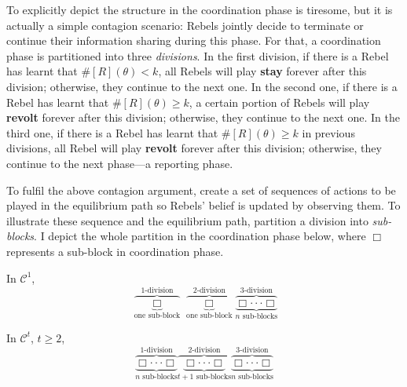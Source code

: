 \documentclass[12pt,letter]{article}
\newcommand{\Kappa}{\mathcal{C}}
\theoremstyle{definition}
\theoremstyle{remark}
\theoremstyle{claim}
\begin{document}
To explicitly depict the structure in the coordination phase is tiresome, but it is actually a simple contagion scenario: Rebels jointly decide to terminate or continue their information sharing during this phase. For that, a coordination phase is partitioned into three \textit{divisions}. In the first division, if there is a Rebel has learnt that $\#[R](\theta)<k$, all Rebels will play \textbf{stay} forever after this division; otherwise, they continue to the next one. In the second one, if there is a Rebel has learnt that $\#[R](\theta)\geq k$, a certain portion of Rebels will play \textbf{revolt} forever after this division; otherwise, they continue to the next one. In the third one, if there is a Rebel has learnt that $\#[R](\theta)\geq k$ in previous divisions, all Rebel will play \textbf{revolt} forever after this division; otherwise, they continue to the next phase---a reporting phase.

To fulfil the above contagion argument, create a set of sequences of actions to be played in the equilibrium path so Rebels' belief is updated by observing them. To illustrate these sequence and the equilibrium path, partition a division into \textit{sub-blocks}. I depict the whole partition in the coordination phase below, where $\Box$ represents a sub-block in coordination phase. 

In $\Kappa^1$, 
\[\overbrace{\underbrace{ \Box }_{\text{one sub-block}}}^{\text{$1$-division}} \overbrace{\underbrace{\Box }_{\text{one sub-block}}}^{\text{$2$-division}} \overbrace{\underbrace{\Box \cdot \cdot \cdot \Box}_{\text{$n$ sub-blocks}}}^{\text{$3$-division}}\] 

In $\Kappa^t$, $t\geq 2$,
\[\overbrace{\underbrace{\Box \cdot \cdot \cdot \Box}_{\text{$n$ sub-blocks}}}^{\text{$1$-division}} \overbrace{\underbrace{\Box \cdot \cdot \cdot \Box}_{\text{$t+1$ sub-blocks}} }^{\text{$2$-division}} \overbrace{\underbrace{\Box \cdot \cdot \cdot \Box}_{\text{$n$ sub-blocks}}}^{\text{$3$-division}}\] 


%
%
%
\end{document}
